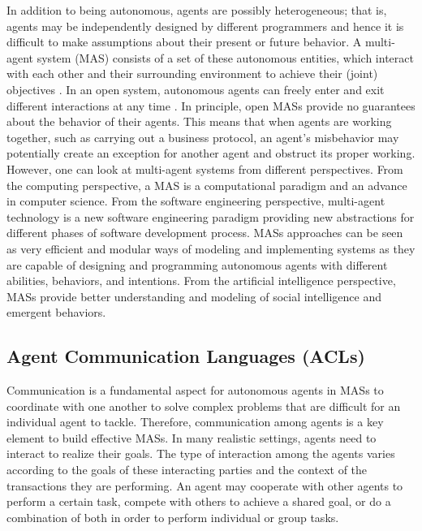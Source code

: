 In addition to being autonomous, agents are possibly heterogeneous; that is, agents may be independently designed by different programmers and hence it is difficult to make assumptions about their present or future behavior.
A multi-agent system (MAS) consists of a set of these autonomous
entities, which interact with each other and their
surrounding environment to achieve their (joint) objectives
\cite{Wooldridge2009}. In an open system, autonomous agents can freely enter and exit different interactions at any time \cite{Fornara2004a}. In principle, open MASs provide no guarantees about the behavior of their agents. This means that when agents are working together, such as carrying out a business protocol, an agent's misbehavior may potentially create an
exception for another agent and obstruct its proper working.
However, one can look at multi-agent systems from different
perspectives. From the computing perspective, a MAS is a
computational paradigm and an advance in computer science. From
the software engineering perspective, multi-agent technology is a
new software engineering paradigm providing new abstractions for
different phases of software development process. MASs approaches
can be seen as very efficient and modular ways of modeling and
implementing systems as they are capable of designing and
programming autonomous agents with different abilities, behaviors,
and intentions. From the artificial intelligence perspective, MASs
provide better understanding and modeling of social intelligence
and emergent behaviors.



\subsection{Agent Communication Languages (ACLs)}
Communication is a fundamental aspect for autonomous agents in MASs to coordinate with one another to solve complex problems that are difficult for an individual agent to tackle. Therefore, communication among agents is a key element to build effective MASs. In many realistic settings, agents need to interact to realize their goals. The type of interaction among the agents varies according to the goals of these interacting parties and the context of the transactions they are performing. An agent may cooperate with other agents to perform a certain task, compete with others to achieve a shared goal, or do a combination of both in order to perform individual or group tasks.

